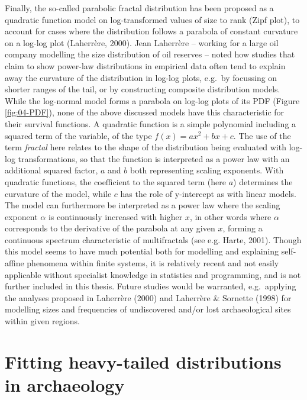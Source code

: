 \documentclass[
  12pt,
]{book}
\begin{document}
Finally, the so-called parabolic fractal distribution has been proposed as a quadratic function model on log-transformed values of size to rank (Zipf plot), to account for cases where the distribution follows a parabola of constant curvature on a log-log plot (Laherrère, 2000). Jean Laherrère -- working for a large oil company modelling the size distribution of oil reserves -- noted how studies that claim to show power-law distributions in empirical data often tend to explain away the curvature of the distribution in log-log plots, e.g.~by focussing on shorter ranges of the tail, or by constructing composite distribution models. While the log-normal model forms a parabola on log-log plots of its PDF (Figure \ref{fig:04-PDF}), none of the above discussed models have this characteristic for their survival functions. A quadratic function is a simple polynomial including a squared term of the variable, of the type \(f(x) = ax^2 + bx + c\). The use of the term \emph{fractal} here relates to the shape of the distribution being evaluated with log-log transformations, so that the function is interpreted as a power law with an additional squared factor, \(a\) and \(b\) both representing scaling exponents. With quadratic functions, the coefficient to the squared term (here \(a\)) determines the curvature of the model, while \(c\) has the role of y-intercept as with linear models. The model can furthermore be interpreted as a power law where the scaling exponent \(\alpha\) is continuously increased with higher \(x\), in other words where \(\alpha\) corresponds to the derivative of the parabola at any given \(x\), forming a continuous spectrum characteristic of multifractals (see e.g. Harte, 2001). Though this model seems to have much potential both for modelling and explaining self-affine phenomena within finite systems, it is relatively recent and not easily applicable without specialist knowledge in statistics and programming, and is not further included in this thesis. Future studies would be warranted, e.g.~applying the analyses proposed in Laherrère (2000) and Laherrère \& Sornette (1998) for modelling sizes and frequencies of undiscovered and/or lost archaeological sites within given regions.

\hypertarget{distfit-archaeo}{%
\section{Fitting heavy-tailed distributions in archaeology}\label{distfit-archaeo}}
\end{document}
